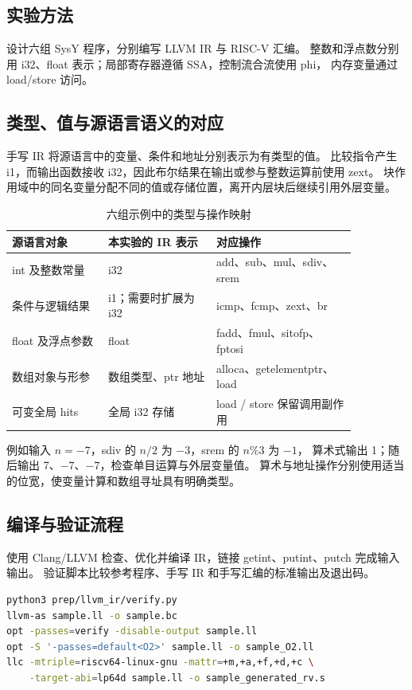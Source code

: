 \subsection{实验方法}
设计六组 SysY 程序，分别编写 LLVM IR 与 RISC-V 汇编。
整数和浮点数分别用 i32、float 表示；局部寄存器遵循 SSA，控制流合流使用 phi，
内存变量通过 load/store 访问。

\subsection{类型、值与源语言语义的对应}
手写 IR 将源语言中的变量、条件和地址分别表示为有类型的值。
比较指令产生 i1，而输出函数接收 i32，因此布尔结果在输出或参与整数运算前使用 zext。
块作用域中的同名变量分配不同的值或存储位置，离开内层块后继续引用外层变量。

\begin{table}[htbp]
\centering\small
\caption{六组示例中的类型与操作映射}
\begin{tabular}{p{0.24\linewidth}p{0.27\linewidth}p{0.35\linewidth}}
\toprule
源语言对象 & 本实验的 IR 表示 & 对应操作\\
\midrule
int 及整数常量 & i32 & add、sub、mul、sdiv、srem\\
条件与逻辑结果 & i1；需要时扩展为 i32 & icmp、fcmp、zext、br\\
float 及浮点参数 & float & fadd、fmul、sitofp、fptosi\\
数组对象与形参 & 数组类型、ptr 地址 & alloca、getelementptr、load\\
可变全局 hits & 全局 i32 存储 & load / store 保留调用副作用\\
\bottomrule
\end{tabular}
\end{table}

例如输入 $n=-7$，sdiv 的 $n/2$ 为 $-3$，srem 的 $n\%3$ 为 $-1$，
算术式输出 1；随后输出 7、$-7$、$-7$，检查单目运算与外层变量值。
算术与地址操作分别使用适当的位宽，使变量计算和数组寻址具有明确类型。

\subsection{编译与验证流程}
使用 Clang/LLVM 检查、优化并编译 IR，链接 getint、putint、putch 完成输入输出。
验证脚本比较参考程序、手写 IR 和手写汇编的标准输出及退出码。
\par\vspace{0.7\baselineskip}\noindent\begin{minipage}[t]{\linewidth}
\begin{lstlisting}[language=bash]
python3 prep/llvm_ir/verify.py
llvm-as sample.ll -o sample.bc
opt -passes=verify -disable-output sample.ll
opt -S '-passes=default<O2>' sample.ll -o sample_O2.ll
llc -mtriple=riscv64-linux-gnu -mattr=+m,+a,+f,+d,+c \
    -target-abi=lp64d sample.ll -o sample_generated_rv.s
\end{lstlisting}
\end{minipage}\par\vspace{0.5\baselineskip}

